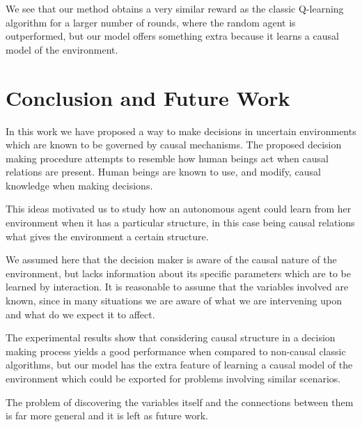 \documentclass{article}
\begin{document}
We see that our method obtains a very similar reward as the classic Q-learning algorithm for a larger number of rounds, where the random agent is outperformed, but our model offers something extra because it learns a causal model of the environment. 

\section{Conclusion and Future Work}
In this work we have proposed a way to make decisions in uncertain environments which are known to be governed by causal mechanisms. The proposed decision making procedure attempts to resemble how human beings act when causal relations are present. Human beings are known to use, and modify, causal knowledge when making decisions. 

This ideas motivated us to study how an autonomous agent could learn from her environment when it has a particular structure, in this case being causal relations what gives the environment a certain structure. 

We assumed here that the decision maker is aware of the causal nature of the environment, but lacks information about its specific parameters which are to be learned by interaction. It is reasonable to assume that the variables involved are known, since in many situations we are aware of what we are intervening upon and what do we expect it to affect. 

The experimental results show that considering causal structure in a decision making process yields a good performance when compared to non-causal classic algorithms, but our model has the extra feature of learning a causal model of the environment which could be exported for problems involving similar scenarios.

The problem of discovering the variables itself and the connections between them is far more general and it is left as future work.



\end{document}
